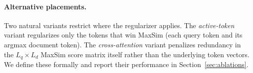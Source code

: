 \paragraph{Alternative placements.} Two natural variants restrict where the regularizer applies. The \emph{active-token} variant regularizes only the tokens that win MaxSim (each query token and its argmax document token). The \emph{cross-attention} variant penalizes redundancy in the $L_q \times L_d$ MaxSim score matrix itself rather than the underlying token vectors. We define these formally and report their performance in Section~\ref{sec:ablations}.
